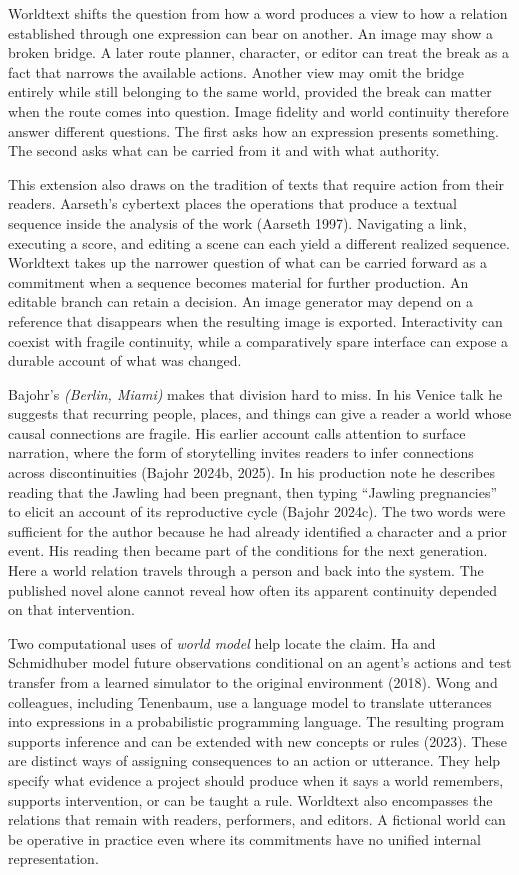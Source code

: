 \documentclass[
  11pt,
  letterpaper,
]{article}
\begin{document}
Worldtext shifts the question from how a word produces a view to how a
relation established through one expression can bear on another. An
image may show a broken bridge. A later route planner, character, or
editor can treat the break as a fact that narrows the available actions.
Another view may omit the bridge entirely while still belonging to the
same world, provided the break can matter when the route comes into
question. Image fidelity and world continuity therefore answer different
questions. The first asks how an expression presents something. The
second asks what can be carried from it and with what authority.

This extension also draws on the tradition of texts that require action
from their readers. Aarseth's cybertext places the operations that
produce a textual sequence inside the analysis of the work (Aarseth
1997). Navigating a link, executing a score, and editing a scene can
each yield a different realized sequence. Worldtext takes up the
narrower question of what can be carried forward as a commitment when a
sequence becomes material for further production. An editable branch can
retain a decision. An image generator may depend on a reference that
disappears when the resulting image is exported. Interactivity can
coexist with fragile continuity, while a comparatively spare interface
can expose a durable account of what was changed.

Bajohr's \emph{(Berlin, Miami)} makes that division hard to miss. In his
Venice talk he suggests that recurring people, places, and things can
give a reader a world whose causal connections are fragile. His earlier
account calls attention to surface narration, where the form of
storytelling invites readers to infer connections across discontinuities
(Bajohr 2024b, 2025). In his production note he describes reading that
the Jawling had been pregnant, then typing ``Jawling pregnancies'' to
elicit an account of its reproductive cycle (Bajohr 2024c). The two
words were sufficient for the author because he had already identified a
character and a prior event. His reading then became part of the
conditions for the next generation. Here a world relation travels
through a person and back into the system. The published novel alone
cannot reveal how often its apparent continuity depended on that
intervention.

Two computational uses of \emph{world model} help locate the claim. Ha
and Schmidhuber model future observations conditional on an agent's
actions and test transfer from a learned simulator to the original
environment (2018). Wong and colleagues, including Tenenbaum, use a
language model to translate utterances into expressions in a
probabilistic programming language. The resulting program supports
inference and can be extended with new concepts or rules (2023). These
are distinct ways of assigning consequences to an action or utterance.
They help specify what evidence a project should produce when it says a
world remembers, supports intervention, or can be taught a rule.
Worldtext also encompasses the relations that remain with readers,
performers, and editors. A fictional world can be operative in practice
even where its commitments have no unified internal representation.
\end{document}
